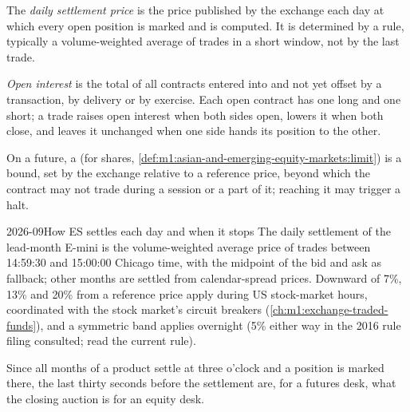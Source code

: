 \begin{definition}\label{def:m1:futures-contracts-and-exchanges:settle}
The \emph{daily settlement price} is the price
published by the exchange each day at which every open position is marked
and  is computed. It is determined by a rule, typically a
volume-weighted average of trades in a short window, not by the last trade.
\end{definition}

\begin{definition}\label{def:m1:futures-contracts-and-exchanges:oi}
\emph{Open interest} is the total of all contracts
entered into and not yet offset by a transaction, by delivery or by
exercise. Each open contract has one long and one short; a trade raises
open interest when both sides open, lowers it when both close, and leaves it
unchanged when one side hands its position to the other.
\end{definition}

\begin{definition}\label{def:m1:futures-contracts-and-exchanges:limit}
On a future, a \emph{} (for shares,
\cref{def:m1:asian-and-emerging-equity-markets:limit}) is a bound, set by the
exchange relative to a reference price, beyond which the contract may not
trade during a session or a part of it; reaching it may trigger a halt.
\end{definition}

\begin{dated}{2026-09}{How ES settles each day and when it stops}\label{dat:m1:futures-contracts-and-exchanges:limits}
The daily settlement of the lead-month E-mini is the volume-weighted average
price of trades between 14:59:30 and 15:00:00 Chicago time, with the
midpoint of the bid and ask as fallback; other months are settled from
calendar-spread prices. Downward  of 7\%, 13\% and 20\% from a
reference price apply during US stock-market hours, coordinated with the
stock market's circuit breakers (\cref{ch:m1:exchange-traded-funds}), and a
symmetric band applies overnight (5\% either way in the 2016 rule filing
consulted; read the current rule).
\end{dated}

Since all months of a product settle at three o'clock and a position is
marked there, the last thirty seconds before the settlement are, for a
futures desk, what the closing auction is for an equity desk.

